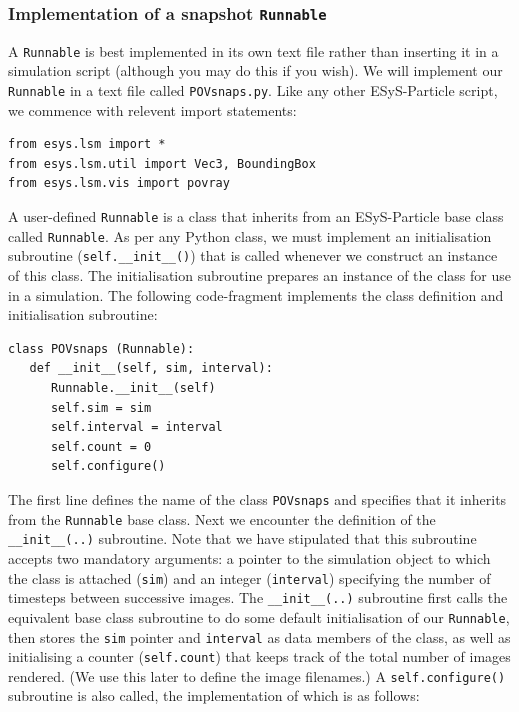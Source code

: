 \subsubsection{Implementation of a snapshot \texttt{Runnable}}

A \texttt{Runnable} is best implemented in its own text file rather than inserting it in a simulation script (although you may do this if you wish). We will implement our \texttt{Runnable} in a text file called \texttt{POVsnaps.py}. Like any other ESyS-Particle script, we commence with relevent import statements:

\begin{verbatim}
from esys.lsm import *
from esys.lsm.util import Vec3, BoundingBox
from esys.lsm.vis import povray
\end{verbatim}

A user-defined \texttt{Runnable} is a class that inherits from an ESyS-Particle base class called \texttt{Runnable}. As per any Python class, we must implement an initialisation subroutine (\texttt{self.\_\_init\_\_()}) that is called whenever we construct an instance of this class. The initialisation subroutine prepares an instance of the class for use in a simulation. The following code-fragment implements the class definition and initialisation subroutine:


\begin{verbatim}
class POVsnaps (Runnable):
   def __init__(self, sim, interval):
      Runnable.__init__(self)
      self.sim = sim
      self.interval = interval
      self.count = 0
      self.configure()
\end{verbatim}


The first line defines the name of the class \texttt{POVsnaps} and specifies that it inherits from the \texttt{Runnable} base class. Next we encounter the definition of the \texttt{\_\_init\_\_(..)} subroutine. Note that we have stipulated that this subroutine accepts two mandatory arguments: a pointer to the simulation object to which the class is attached (\texttt{sim}) and an integer (\texttt{interval}) specifying the number of timesteps between successive images. The \texttt{\_\_init\_\_(..)} subroutine first calls the equivalent base class subroutine to do some default initialisation of our \texttt{Runnable}, then stores the \texttt{sim} pointer and \texttt{interval} as data members of the class, as well as initialising a counter (\texttt{self.count}) that keeps track of the total number of images rendered. (We use this later to define the image filenames.) A \texttt{self.configure()} subroutine is also called, the implementation of which is as follows: 

